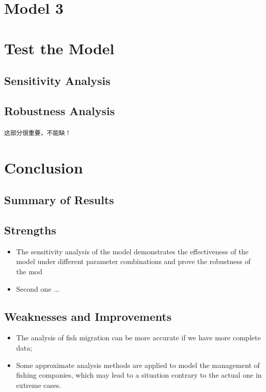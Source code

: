 \documentclass[12pt]{ctexart}
\begin{document}
\section{Model 3}
\section{Test the Model}
\subsection{Sensitivity  Analysis}
\subsection{Robustness Analysis}
\texttt{这部分很重要，不能缺！}








\section{Conclusion}
\subsection{Summary of Results}

\subsection{Strengths}%
\begin{itemize}
  \item The sensitivity analysis of the model demonstrates the effectiveness of the model under different parameter combinations and prove the robustness of the mod
  \item Second one ...
\end{itemize}

\subsection{Weaknesses and Improvements}%
\begin{itemize}
  \item The analysis of fish migration can be more accurate if we have more complete data;
  \item Some approximate analysis methods are applied to model the management of fishing
        companies, which may lead to a situation contrary to the actual one  in extreme cases.
\end{itemize}
\end{document}
